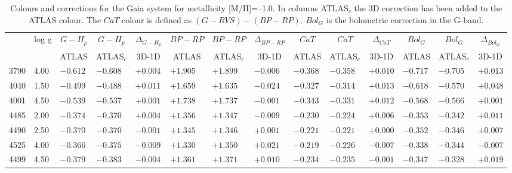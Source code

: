 \documentclass[]{aa}
\def\teff{$T\rm_{eff}$}
\begin{document}
\begin{appendix}
\begin{table*}
\caption{\label{Gaiam10}
Colours and corrections for the Gaia system for metallicity [M/H]=--1.0. In columns ATLAS$_c$ the 3D correction
has been added to the ATLAS colour. The $CaT$ colour is defined as $(G-RVS)-(BP-RP)$. $Bol_G$ is the bolometric
correction in the G-band. }
\renewcommand{\tabcolsep}{3pt}
\tabskip=0pt
\begin{center}
\begin{tabular}{llllllllllllll}
\hline\noalign{\smallskip}
\multicolumn{1}{c}{\teff} & 
\multicolumn{1}{c}{log g} & 
\multicolumn{1}{c}{$G-H_p$} &
\multicolumn{1}{c}{$G-H_p$} &
\multicolumn{1}{c}{$\Delta_{G-H_p}$} &
\multicolumn{1}{c}{$BP-RP$} &
\multicolumn{1}{c}{$BP-RP$} &
\multicolumn{1}{c}{$\Delta_{BP-RP}$} &
\multicolumn{1}{c}{$CaT$} &
\multicolumn{1}{c}{$CaT$} &
\multicolumn{1}{c}{$\Delta_{CaT}$} & 
\multicolumn{1}{c}{$Bol_G$} &
\multicolumn{1}{c}{$Bol_G$} &
\multicolumn{1}{c}{$\Delta_{Bol_G}$} \\
\multicolumn{2}{c}{ } &  
\multicolumn{1}{c}{ATLAS} &
\multicolumn{1}{c}{ATLAS$_c$}&
\multicolumn{1}{c}{3D-1D}&
\multicolumn{1}{c}{ATLAS} &
\multicolumn{1}{c}{ATLAS$_c$}&
\multicolumn{1}{c}{3D-1D}&
\multicolumn{1}{c}{ATLAS} &
\multicolumn{1}{c}{ATLAS$_c$}&
\multicolumn{1}{c}{3D-1D}&
\multicolumn{1}{c}{ATLAS} &
\multicolumn{1}{c}{ATLAS$_c$}&
\multicolumn{1}{c}{3D-1D} \\
\hline\noalign{\smallskip}
\hline\noalign{\smallskip}
3790  &4.00& $ -0.612$&$  -0.608$&$  +0.004$&$  +1.905$&$  +1.899$&$  -0.006$&$  -0.368$&$  -0.358$&$  +0.010$&$  -0.717$&$-0.705$&$+0.013$\\
4040  &1.50& $ -0.499$&$  -0.488$&$  +0.011$&$  +1.659$&$  +1.635$&$  -0.024$&$  -0.327$&$  -0.314$&$  +0.013$&$  -0.618$&$-0.570$&$+0.048$\\
4001  &4.50& $ -0.539$&$  -0.537$&$  +0.001$&$  +1.738$&$  +1.737$&$  -0.001$&$  -0.343$&$  -0.331$&$  +0.012$&$  -0.568$&$-0.566$&$+0.001$\\
4485  &2.00& $ -0.374$&$  -0.370$&$  +0.004$&$  +1.356$&$  +1.347$&$  -0.009$&$  -0.230$&$  -0.224$&$  +0.006$&$  -0.353$&$-0.342$&$+0.011$\\
4490  &2.50& $ -0.370$&$  -0.370$&$  -0.001$&$  +1.345$&$  +1.346$&$  +0.001$&$  -0.221$&$  -0.221$&$  +0.000$&$  -0.352$&$-0.346$&$+0.007$\\
4525  &4.00& $ -0.366$&$  -0.375$&$  -0.009$&$  +1.330$&$  +1.350$&$  +0.021$&$  -0.219$&$  -0.226$&$  -0.007$&$  -0.338$&$-0.344$&$-0.007$\\
4499  &4.50& $ -0.379$&$  -0.383$&$  -0.004$&$  +1.361$&$  +1.371$&$  +0.010$&$  -0.234$&$  -0.235$&$  -0.001$&$  -0.347$&$-0.328$&$+0.019$\\

\end{tabular}
\end{center}
\end{table*}
\end{appendix}
\end{document}
